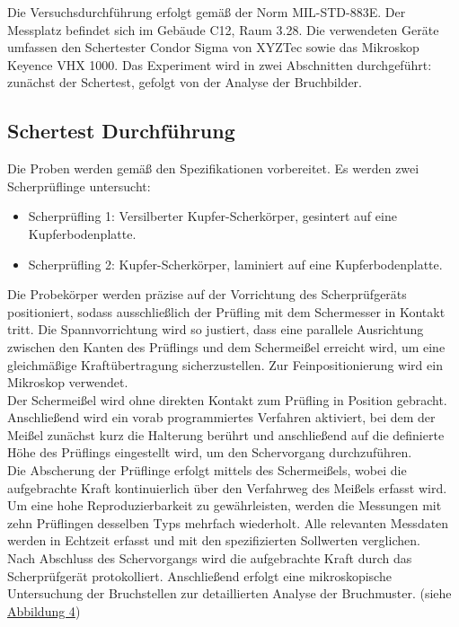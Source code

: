 Die Versuchsdurchführung erfolgt gemäß der Norm MIL-STD-883E. Der Messplatz befindet sich im Gebäude C12, Raum 3.28. Die verwendeten Geräte umfassen den Schertester Condor Sigma von XYZTec sowie das Mikroskop Keyence VHX 1000. Das Experiment wird in zwei Abschnitten durchgeführt: zunächst der Schertest, gefolgt von der Analyse der Bruchbilder.

\subsection{Schertest Durchführung}
Die Proben werden gemäß den Spezifikationen vorbereitet. Es werden zwei Scherprüflinge untersucht:
\begin{itemize}
    \item Scherprüfling 1: Versilberter Kupfer-Scherkörper, gesintert auf eine Kupferbodenplatte.
    \item     Scherprüfling 2: Kupfer-Scherkörper, laminiert auf eine Kupferbodenplatte.
\end{itemize}
Die Probekörper werden präzise auf der Vorrichtung des Scherprüfgeräts positioniert, sodass ausschließlich der Prüfling mit dem Schermesser in Kontakt tritt. Die Spannvorrichtung wird so justiert, dass eine parallele Ausrichtung zwischen den Kanten des Prüflings und dem Schermeißel erreicht wird, um eine gleichmäßige Kraftübertragung sicherzustellen. Zur Feinpositionierung wird ein Mikroskop verwendet.\\

Der Schermeißel wird ohne direkten Kontakt zum Prüfling in Position gebracht. Anschließend wird ein vorab programmiertes Verfahren aktiviert, bei dem der Meißel zunächst kurz die Halterung berührt und anschließend auf die definierte Höhe des Prüflings eingestellt wird, um den Schervorgang durchzuführen.\\

Die Abscherung der Prüflinge erfolgt mittels des Schermeißels, wobei die aufgebrachte Kraft kontinuierlich über den Verfahrweg des Meißels erfasst wird. Um eine hohe Reproduzierbarkeit zu gewährleisten, werden die Messungen mit zehn Prüflingen desselben Typs mehrfach wiederholt. Alle relevanten Messdaten werden in Echtzeit erfasst und mit den spezifizierten Sollwerten verglichen.\\

Nach Abschluss des Schervorgangs wird die aufgebrachte Kraft durch das Scherprüfgerät protokolliert. Anschließend erfolgt eine mikroskopische Untersuchung der Bruchstellen zur detaillierten Analyse der Bruchmuster. (siehe \hyperref[CondorSigma]{Abbildung 4})

